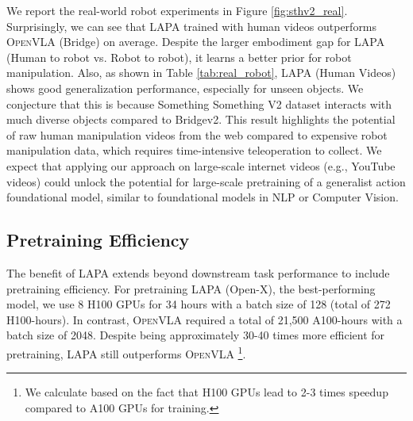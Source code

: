 \documentclass{article} %
\begin{document}
We report the real-world robot experiments in Figure \ref{fig:sthv2_real}.
Surprisingly, we can see that LAPA trained with human videos outperforms \textsc{OpenVLA} (Bridge) on average. Despite the larger embodiment gap for LAPA (Human to robot vs. Robot to robot), it learns a better prior for robot manipulation. {Also, as shown in Table \ref{tab:real_robot}, LAPA (Human Videos) shows good generalization performance, especially for unseen objects. We conjecture that this is because Something Something V2 dataset interacts with much diverse objects compared to Bridgev2.}
This result highlights the potential of raw human manipulation videos from the web compared to expensive robot manipulation data, which requires time-intensive teleoperation to collect. We expect that applying our approach on large-scale internet videos (e.g., YouTube videos) could unlock the potential for large-scale pretraining of a generalist action foundational model, similar to foundational models in NLP or Computer Vision.



\subsection{Pretraining Efficiency}
\label{subsec:pretrain_efficiency}
The benefit of LAPA extends beyond downstream task performance to include pretraining efficiency. For pretraining LAPA (Open-X), the best-performing model, we use 8 H100 GPUs for 34 hours with a batch size of 128 (total of 272 H100-hours). In contrast, \textsc{OpenVLA} required a total of 21,500 A100-hours with a batch size of 2048. Despite being approximately 30-40 times more efficient for pretraining, LAPA still outperforms \textsc{OpenVLA} \footnote{We calculate based on the fact that H100 GPUs lead to 2-3 times speedup compared to A100 GPUs for training.}.
\end{document}
